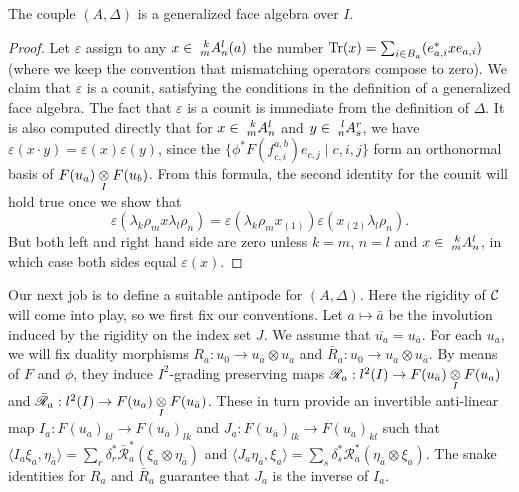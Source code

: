 
\begin{Prop} The couple $(A,\Delta)$ is a generalized face algebra over $I$.
\end{Prop}
\begin{proof} Let $\varepsilon$ assign to any $x\in \Gr{A}{k}{l}{m}{n}(a)$ the number $\Tr(x) = \sum_{i\in B_a} (e_{a,i}^*xe_{a,i})$ (where we keep the convention that mismatching operators compose to zero). We claim that $\varepsilon$ is a counit, satisfying the conditions in the definition of a generalized face algebra. The fact that $\varepsilon$ is a counit is immediate from the definition of $\Delta$. It is also computed directly that for $x\in \Gr{A}{k}{l}{m}{n}$ and $y\in \Gr{A}{l}{r}{n}{s}$, we have $\varepsilon(x\cdot y) = \varepsilon(x)\varepsilon(y)$, since the $\{\phi^*F(f_{c,i}^{a,b})e_{c,j}\mid c,i,j\}$ form an orthonormal basis of $F(u_a)\iitimes F(u_b)$. From this formula, the second identity for the counit will hold true once we show that \[\varepsilon(\lambda_k\rho_mx\lambda_l\rho_n) = \varepsilon(\lambda_k\rho_mx_{(1)})\varepsilon(x_{(2)}\lambda_l\rho_n).\] But both left and right hand side are zero unless $k=m$, $n=l$ and $x\in \Gr{A}{k}{l}{m}{n}$, in which case both sides equal $\varepsilon(x)$.
\end{proof}

Our next job is to define a suitable antipode for $(A,\Delta)$. Here the rigidity of $\CatC$ will come into play, so we first fix our conventions. Let $a \mapsto \bar{a}$ be the involution induced by the rigidity on the index set $J$. We assume that $\overline{u_a} = u_{\bar{a}}$. For each $u_a$, we will fix duality morphisms $R_a: u_0\rightarrow u_{\bar{a}}\otimes u_a$ and $\bar{R}_a: u_0\rightarrow u_a\otimes u_{\bar{a}}$. By means of $F$ and $\phi$, they induce $I^2$-grading preserving maps $\mathscr{R}_a: l^2(I) \rightarrow F(u_{\bar{a}})\iitimes F(u_a)$ and $\bar{\mathscr{R}}_a:l^2(I) \rightarrow F(u_a)\iitimes F(u_{\bar{a}})$. These in turn provide an invertible anti-linear map $I_a:F(u_a)_{kl}\rightarrow F(u_{\bar{a}})_{lk}$ and $J_a: F(u_{\bar{a}})_{lk}\rightarrow F(u_{a})_{kl}$ such that $\langle I_{a}\xi_a,\eta_{\bar{a}}\rangle = \sum_r\delta_r^* \bar{\mathscr{R}}_a^*(\xi_a\otimes \eta_{\bar{a}})$ and $\langle J_a\eta_{\bar{a}},\xi_a\rangle = \sum_s \delta_s^* \mathscr{R}_a^* (\eta_{\bar{a}}\otimes \xi_a)$. The snake identities for $R_a$ and $\bar{R}_a$ guarantee that $J_a$ is the inverse of $I_a$.

